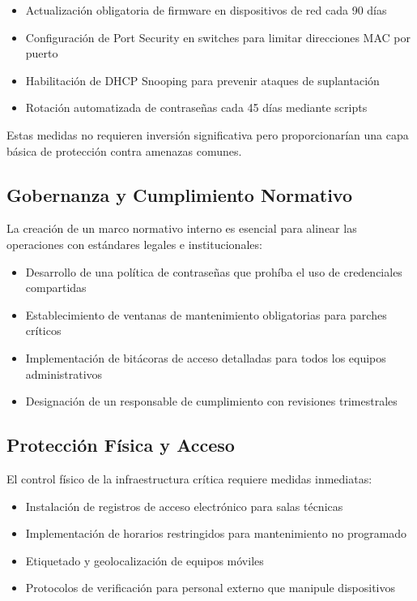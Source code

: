 \begin{itemize}
	\item Actualización obligatoria de firmware en dispositivos de red cada 90 días
	\item Configuración de Port Security en switches para limitar direcciones MAC por puerto
	\item Habilitación de DHCP Snooping para prevenir ataques de suplantación
	\item Rotación automatizada de contraseñas cada 45 días mediante scripts
\end{itemize}

Estas medidas no requieren inversión significativa pero proporcionarían una capa básica de protección contra amenazas comunes.

\subsection*{Gobernanza y Cumplimiento Normativo}
La creación de un marco normativo interno es esencial para alinear las operaciones con estándares legales e institucionales:

\begin{itemize}
	\item Desarrollo de una política de contraseñas que prohíba el uso de credenciales compartidas
	\item Establecimiento de ventanas de mantenimiento obligatorias para parches críticos
	\item Implementación de bitácoras de acceso detalladas para todos los equipos administrativos
	\item Designación de un responsable de cumplimiento con revisiones trimestrales
\end{itemize}

\subsection*{Protección Física y Acceso}
El control físico de la infraestructura crítica requiere medidas inmediatas:

\begin{itemize}
	\item Instalación de registros de acceso electrónico para salas técnicas
	\item Implementación de horarios restringidos para mantenimiento no programado
	\item Etiquetado y geolocalización de equipos móviles
	\item Protocolos de verificación para personal externo que manipule dispositivos
\end{itemize}

